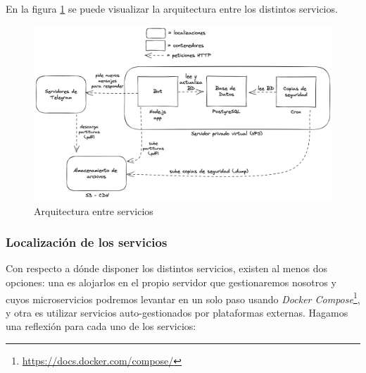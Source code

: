 En la figura \ref{fig:arquitecturaServicios} se puede visualizar la arquitectura entre los distintos servicios.

\begin{figure}[h]
\centering
\includegraphics[width=\textwidth]{imagenes/disenyo_tecnico/arquitectura_servicios.png}
\caption{Arquitectura entre servicios}
\label{fig:arquitecturaServicios}
\end{figure}

\subsubsection{Localización de los servicios}

Con respecto a dónde disponer los distintos servicios, existen al menos dos opciones: una es alojarlos en el propio servidor que gestionaremos nosotros y cuyos microservicios podremos levantar en un solo paso usando \textit{Docker Compose}\footnote{\url{https://docs.docker.com/compose/}}, y otra es utilizar servicios auto-gestionados por plataformas externas. Hagamos una reflexión para cada uno de los servicios:

